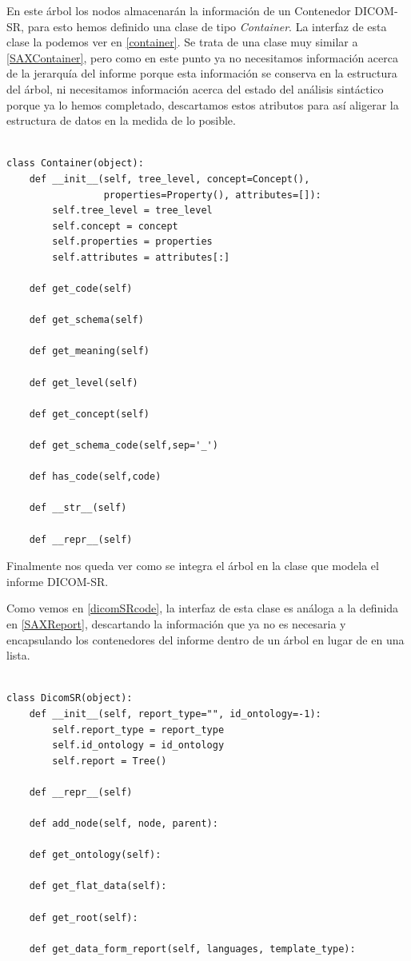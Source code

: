 En este árbol los nodos almacenarán la información de un Contenedor DICOM-SR, para esto hemos definido una clase de tipo \emph{Container}. La interfaz de esta clase la podemos ver en \ref{container}. Se trata de una clase muy similar a \ref{SAXContainer}, pero como en este punto ya no necesitamos información acerca de la jerarquía del informe porque esta información se conserva en la estructura del árbol, ni necesitamos información acerca del estado del análisis sintáctico porque ya lo hemos completado, descartamos estos atributos para así aligerar la estructura de datos en la medida de lo posible.\par

\begin{lstlisting}[label=container,caption=Clase para contenedores DICOM-SR]

class Container(object):
    def __init__(self, tree_level, concept=Concept(), 
    			 properties=Property(), attributes=[]):
        self.tree_level = tree_level
        self.concept = concept
        self.properties = properties
        self.attributes = attributes[:]

    def get_code(self)

    def get_schema(self)

    def get_meaning(self)

    def get_level(self)

    def get_concept(self)

    def get_schema_code(self,sep='_')

    def has_code(self,code)

    def __str__(self)

    def __repr__(self)

\end{lstlisting}

Finalmente nos queda ver como se integra el árbol en la clase que modela el informe DICOM-SR.\par
Como vemos en \ref{dicomSRcode}, la interfaz de esta clase es análoga a la definida en \ref{SAXReport}, descartando la información que ya no es necesaria y encapsulando los contenedores del informe dentro de un árbol en lugar de en una lista.\par

\begin{lstlisting}[label=dicomSRcode,caption=Clase para contenedores DICOM-SR]

class DicomSR(object):
    def __init__(self, report_type="", id_ontology=-1):
        self.report_type = report_type
        self.id_ontology = id_ontology
        self.report = Tree()

    def __repr__(self)

    def add_node(self, node, parent):

    def get_ontology(self):

    def get_flat_data(self):

    def get_root(self):

    def get_data_form_report(self, languages, template_type):

\end{lstlisting}

